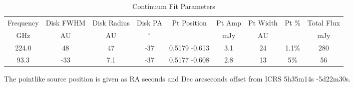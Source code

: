 \begin{table*}[htp]
\centering
\caption{Continuum Fit Parameters}
\begin{tabular}{ccccccccc}
\label{tab:continuum_fit_parameters}
Frequency & Disk FWHM & Disk Radius & Disk PA & Pt Position & Pt Amp & Pt Width & Pt \% & Total Flux \\
$\mathrm{GHz}$ & $\mathrm{AU}$ & $\mathrm{AU}$ & $\mathrm{{}^{\circ}}$ &  & $\mathrm{mJy}$ & $\mathrm{AU}$ & $\mathrm{}$ & $\mathrm{mJy}$ \\
\hline
224.0 & 48 & 47 & -37 & 0.5179 -0.613 & 3.1 & 24 & 1.1\% & 280 \\
93.3 & -33 & 7.1 & -37 & 0.5177 -0.608 & 2.8 & 13 & 5\% & 56 \\
\hline
\end{tabular}

\par The pointlike source position is given as RA seconds and Dec arcseconds offset from ICRS 5h35m14s -5d22m30s.
\end{table*}
